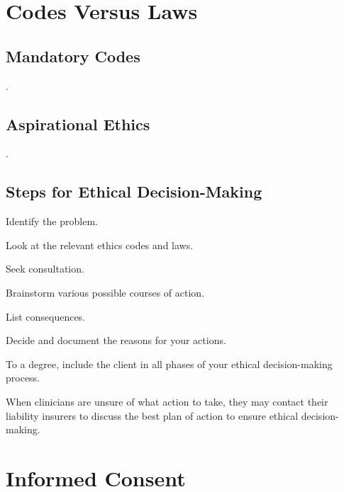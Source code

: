\section{Codes Versus Laws}

\subsection{Mandatory Codes}

\begin{coloredlist}
    \item .
\end{coloredlist}

\subsection{Aspirational Ethics}

\begin{coloredlist}
    \item .
\end{coloredlist}

\subsection{Steps for Ethical Decision-Making}

\begin{coloredlist}
    \item Identify the problem.
    \item Look at the relevant ethics codes and laws.
    \item Seek consultation.
    \item Brainstorm various possible courses of action.
    \item List consequences.
    \item Decide and document the reasons for your actions.
    \item To a degree, include the client in all phases of your ethical decision-making process.
    \item When clinicians are unsure of what action to take, they may contact their liability insurers to discuss the best plan of action to ensure ethical decision-making.
\end{coloredlist}

\section{Informed Consent}

